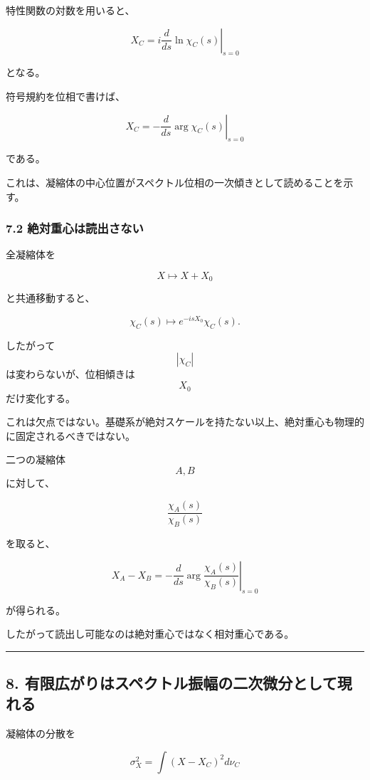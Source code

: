\documentclass[
  a4paper,
]{ltjsarticle}
\begin{document}
特性関数の対数を用いると、

\[
\boxed{
X_C
=
i
\left.
\frac{d}{ds}
\ln\chi_C(s)
\right|_{s=0}
}
\tag{18}
\]

となる。

符号規約を位相で書けば、

\[
\boxed{
X_C
=
-
\left.
\frac{d}{ds}
\arg\chi_C(s)
\right|_{s=0}
}
\tag{19}
\]

である。

これは、凝縮体の中心位置がスペクトル位相の一次傾きとして読めることを示す。

\subsubsection{7.2
絶対重心は読出さない}\label{ux7d76ux5bfeux91cdux5fc3ux306fux8aadux51faux3055ux306aux3044}

全凝縮体を

\[
X\mapsto X+X_0
\]

と共通移動すると、

\[
\chi_C(s)
\mapsto
 e^{-isX_0}\chi_C(s).
\tag{20}
\]

したがって \[|\chi_C|\] は変わらないが、位相傾きは \[X_0\]
だけ変化する。

これは欠点ではない。基礎系が絶対スケールを持たない以上、絶対重心も物理的に固定されるべきではない。

二つの凝縮体 \[A,B\] に対して、

\[
\frac{\chi_A(s)}{\chi_B(s)}
\]

を取ると、

\[
\boxed{
X_A-X_B
=
-
\left.
\frac{d}{ds}
\arg
\frac{\chi_A(s)}{\chi_B(s)}
\right|_{s=0}
}
\tag{21}
\]

が得られる。

したがって読出し可能なのは絶対重心ではなく相対重心である。

\begin{center}\rule{0.5\linewidth}{0.5pt}\end{center}

\subsection{8.
有限広がりはスペクトル振幅の二次微分として現れる}\label{ux6709ux9650ux5e83ux304cux308aux306fux30b9ux30daux30afux30c8ux30ebux632fux5e45ux306eux4e8cux6b21ux5faeux5206ux3068ux3057ux3066ux73feux308cux308b}

凝縮体の分散を

\[
\sigma_X^2
=
\int
(X-X_C)^2
d\nu_C
\tag{22}
\]
\end{document}
